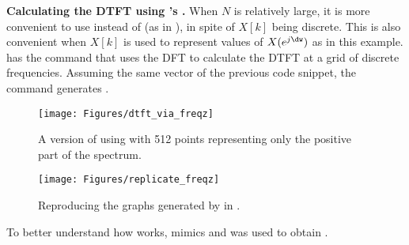 
\bApplication \textbf{Calculating the DTFT using {\matlab}'s .}
When $N$ is relatively large, it is more convenient to use  instead of  (as in ), in spite of $X[k]$ being discrete. This is also convenient when $X[k]$ is used to represent values of $X(e^{j\dw})$ as in this example. {\matlab} has the command  that uses the DFT to calculate the DTFT at a grid of discrete frequencies. Assuming the same vector  of the previous code snippet, the command  generates .

\begin{figure}[!htb]
        \centering
                \texttt{[image: Figures/dtft\_via\_freqz]}              
        \caption{A version of  using  with 512 points representing only the positive part of the spectrum.\label{fig:dtft_via_freqz}}
\end{figure}

\begin{figure}[!htb]
        \centering
                \texttt{[image: Figures/replicate\_freqz]}             
        \caption{Reproducing the graphs generated by  in .\label{fig:replicate_freqz}}
\end{figure}

To better understand how  works,  mimics  and was used to obtain .

